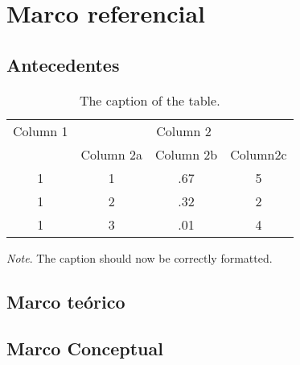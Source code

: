\chapter{Marco referencial}
\section{Antecedentes}

\begin{table}[htpb]
\centering
\caption{The caption of the table.}
\begin{tabular}{cccc}
\toprule
Column 1 & \multicolumn{3}{c}{Column 2} \\
& Column 2a & Column 2b & Column2c \\
\midrule
1 & 1 & .67 & 5 \\
1 & 2 & .32 & 2 \\
1 & 3 & .01 & 4 \\
\bottomrule
\end{tabular}

\bigskip
\small\textit{Note}. The caption should now be correctly formatted.
\end{table}
\section{Marco teórico}
\section{Marco Conceptual}
